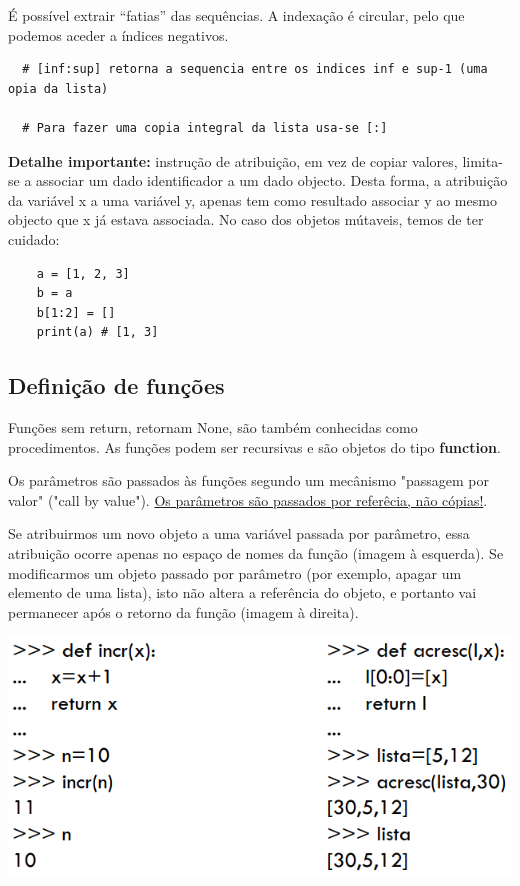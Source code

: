 \documentclass{article}
\begin{document}
\vspace{2mm}

É possível extrair “fatias” das sequências. A indexação é circular, pelo que podemos aceder a
índices negativos.

\begin{lstlisting}
  # [inf:sup] retorna a sequencia entre os indices inf e sup-1 (uma opia da lista)

  # Para fazer uma copia integral da lista usa-se [:]
\end{lstlisting}

\begin{flushleft}
  \textbf{Detalhe importante:}  instrução de atribuição, em vez de copiar valores, limita-se
  a associar um dado identificador a um dado objecto. Desta forma, a atribuição
  da variável x a uma variável y, apenas tem como resultado associar y
  ao mesmo objecto que x já estava associada. No caso dos objetos
  mútaveis, temos de ter cuidado:

  \begin{lstlisting}
    a = [1, 2, 3]
    b = a
    b[1:2] = []
    print(a) # [1, 3]
  \end{lstlisting}
\end{flushleft}

\subsection{Definição de funções}

Funções sem return, retornam None, são também conhecidas como procedimentos. As funções podem
ser recursivas e são objetos do tipo \textbf{function}.

\vspace{2mm}

Os parâmetros são passados às funções segundo um mecânismo "passagem por valor"
("call by value"). \uline{Os parâmetros são passados por referêcia, não cópias!}. 

\vspace{2mm}

Se atribuirmos um novo objeto a uma variável passada por
parâmetro, essa atribuição ocorre apenas no espaço de nomes da função (imagem à
esquerda). Se modificarmos um objeto passado por parâmetro (por
exemplo, apagar um elemento de uma lista), isto não altera a
referência do objeto, e portanto vai permanecer após o
retorno da função (imagem à direita).

\begin{center}
  \includegraphics[scale=0.3]{4}
\end{center}
\end{document}
